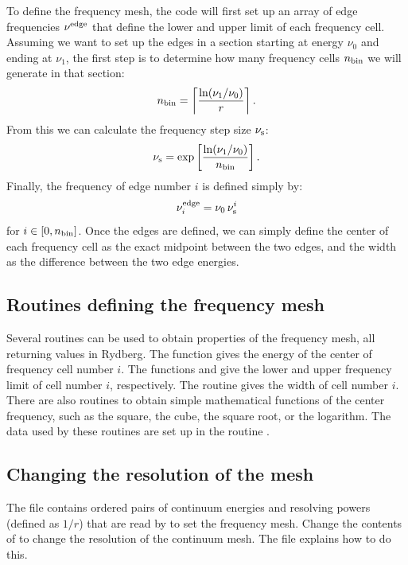 To define the frequency mesh, the code will first set up an array of edge
frequencies $\nu^{\rm edge}$ that define the lower and upper limit of each
frequency cell. Assuming we want to set up the edges in a section starting at
energy $\nu_0$ and ending at $\nu_1$, the first step is to determine how many
frequency cells $n_{\rm bin}$ we will generate in that section:
\begin{equation}
  n_{\rm bin} = \left\lceil \frac{\ln(\nu_1/\nu_0)}{r} \right\rceil.
\end{equation}
From this we can calculate the frequency step size $\nu_{\rm s}$:
\begin{equation}
  \nu_{\rm s} = \exp\left[ \frac{\ln(\nu_1/\nu_0)}{n_{\rm bin}} \right].
\end{equation}
Finally, the frequency of edge number $i$ is defined simply by:
\begin{equation}
  \nu^{\rm edge}_i = \nu_0 \, \nu_{\rm s}^i
\end{equation}
for $i \in [0,n_{\rm bin}]$. Once the edges are defined, we can simply define
the center of each frequency cell as the exact midpoint between the two edges,
and the width as the difference between the two edge energies.

\subsection{Routines defining the frequency mesh}

Several routines can be used to obtain properties of the frequency mesh, all
returning values in Rydberg. The function  gives the energy
of the center of frequency cell number $i$. The functions
 and  give the lower and upper
frequency limit of cell number $i$, respectively. The routine
 gives the width of cell number $i$. There are also
routines to obtain simple mathematical functions of the center frequency, such
as the square, the cube, the square root, or the logarithm. The data used by
these routines are set up in the routine .

\subsection{Changing the resolution of the mesh}
\label{sec:ChangingMeshResolution}

The file  contains ordered pairs of continuum
energies and resolving powers (defined as $1/r$) that are read by
 to set the frequency mesh. Change the
contents of  to change the resolution of the
continuum mesh. The file explains how to do this.


